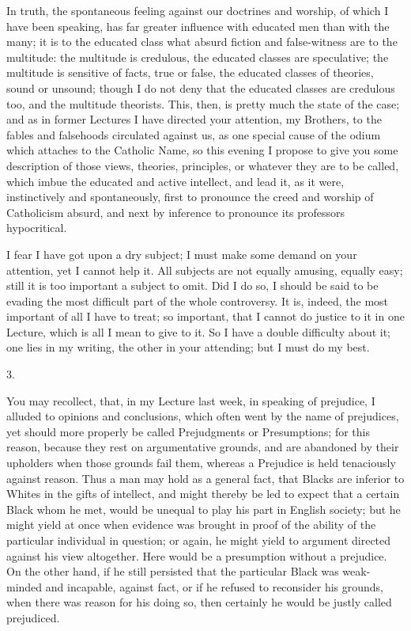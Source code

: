 In truth, the spontaneous feeling against our
doctrines and worship, of which I have been speaking, has
far greater influence with educated men than with the
many; it is to the educated class what absurd fiction and
false-witness are to the multitude: the multitude is
credulous, the educated classes are speculative; the
multitude is sensitive of facts, true or false, the
educated classes of theories, sound or unsound; though I
do not deny that the educated classes are credulous too,
and the multitude theorists. This, then, is pretty much
the state of the case; and as in former Lectures I have
directed your attention, my Brothers, to the fables and
falsehoods circulated against us, as one special cause of
the odium which attaches to the Catholic Name, so this
evening I propose to give you some description of those
views, theories, principles, or whatever they are to be
called, which imbue the educated and active intellect,
and lead it, as it were, instinctively and spontaneously,
first to pronounce the creed and worship of Catholicism
absurd, and next by inference to pronounce its professors
hypocritical.

I fear I have got upon a dry subject; I must make some
demand on your attention, yet I cannot help it. All
subjects are not equally amusing, equally easy; still it
is too important a subject to omit. Did I do so, I should
be said to be evading the most difficult part of the
whole controversy. It is, indeed, the most important of
all I have to treat; so important, that I cannot do
justice to it in one Lecture, which is all I mean to give
to it. So I have a double difficulty about it; one lies
in my writing, the other in your attending; but I must do
my best.

3.

You may recollect, that, in my Lecture last week, in
speaking of prejudice, I alluded to opinions and
conclusions, which often went by the name of prejudices,
yet should more properly be called Prejudgments or
Presumptions; for this reason, because they rest on
argumentative grounds, and are abandoned by their
upholders when those grounds fail them, whereas a
Prejudice is held tenaciously against reason. Thus a man
may hold as a general fact, that Blacks are inferior to
Whites in the gifts of intellect, and might thereby be
led to expect that a certain Black whom he met, would be
unequal to play his part in English society; but he might
yield at once when evidence was brought in proof of the
ability of the particular individual in question; or
again, he might yield to argument directed against his
view altogether. Here would be a presumption without a
prejudice. On the other hand, if he still persisted that
the particular Black was weak-minded and incapable,
against fact, or if he refused to reconsider his grounds,
when there was reason for his doing so, then certainly he
would be justly called prejudiced.

